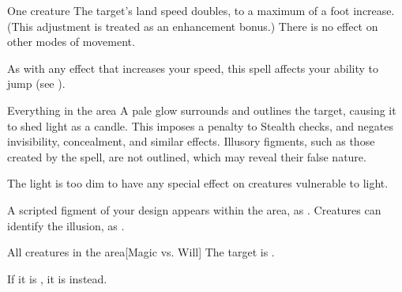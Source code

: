 \spellrng{\rngclose}
\spelldur{\durshort \dismissable}
\begin{spelltarget}{One creature}
    \spelleffect The target's land speed doubles, to a maximum of a  foot increase. (This adjustment is treated as an enhancement bonus.) There is no effect on other modes of movement.
\end{spelltarget}
\spellnotes As with any effect that increases your speed, this spell affects your ability to jump (see ).

\begin{comment}
\subsubsection{F}
\end{comment}

\spelldur{\durshort \dismissable}
\begin{spelltarget}{Everything in the area}
    \spelleffect A pale glow surrounds and outlines the target, causing it to shed light as a candle. This imposes a  penalty to Stealth checks, and negates invisibility, concealment, and similar effects. Illusory figments, such as those created by the  spell, are not outlined, which may reveal their false nature.
\end{spelltarget}
\spellnotes The light is too dim to have any special effect on creatures vulnerable to light.

\spelldur{\durlong \dismissable}
\spellline
\spelleffect A scripted figment of your design appears within the area, as .
\spellnotes Creatures can identify the illusion, as .

\spelldur{\durshort \dismissable}
\begin{spelltarget}{All creatures in the area}[Magic vs. Will]
    \spellsuccess The target is \shaken.

    If it is \bloodied, it is \frightened instead.
\end{spelltarget}

